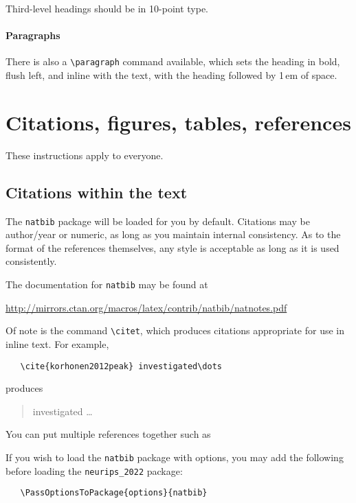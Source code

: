 \documentclass{article}
\begin{document}
Third-level headings should be in 10-point type.


\paragraph{Paragraphs}


There is also a \verb+\paragraph+ command available, which sets the heading in
bold, flush left, and inline with the text, with the heading followed by 1\,em
of space.


\section{Citations, figures, tables, references}
\label{others}


These instructions apply to everyone.


\subsection{Citations within the text}


The \verb+natbib+ package will be loaded for you by default.  Citations may be
author/year or numeric, as long as you maintain internal consistency.  As to the
format of the references themselves, any style is acceptable as long as it is
used consistently.


The documentation for \verb+natbib+ may be found at
\begin{center}
  \url{http://mirrors.ctan.org/macros/latex/contrib/natbib/natnotes.pdf}
\end{center}
Of note is the command \verb+\citet+, which produces citations appropriate for
use in inline text.  For example,
\begin{verbatim}
   \cite{korhonen2012peak} investigated\dots
\end{verbatim}
produces
\begin{quote}
  \cite{korhonen2012peak} investigated \dots
\end{quote}
You can put
multiple references together such as \cite{korhonen2012peak}


If you wish to load the \verb+natbib+ package with options, you may add the
following before loading the \verb+neurips_2022+ package:
\begin{verbatim}
   \PassOptionsToPackage{options}{natbib}
\end{verbatim}
\end{document}
